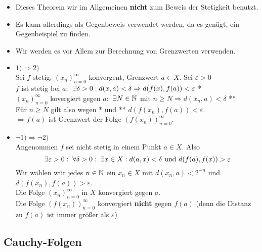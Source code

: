 \documentclass[main.tex]{subfiles}
\begin{document}
\begin{Bemerkung}
  \begin{itemize}
    \item Dieses Theorem wir im Allgemeinen \textbf{nicht} zum Beweis der Stetigkeit benutzt.
    \item Es kann allerdings als Gegenbeweis verwendet werden, da es genügt, ein Gegenbeispiel zu finden.
    \item Wir werden es vor Allem zur Berechnung von Grenzwerten verwenden.
  \end{itemize}
\end{Bemerkung}

\begin{Beweis}
  \begin{itemize}
    \item $1) \Rightarrow 2)$\\
      Sei $f$ stetig, $(x_n)_{n=0}^\infty$ konvergent, Grenzwert $a \in X$. Sei $\varepsilon > 0$\\
      $f$ ist stetig bei $a$: $\;\exists \delta > 0 : d(x,a) <  \delta \Rightarrow d(f(x),f(a)) < \varepsilon$ * \\
      $(x_n)_{n=0}^\infty$ kovergiert gegen $a$: $\;\exists N \in \mathbb{N}$ mit $n \geq N \Rightarrow d(x_n,a) < \delta$ **\\
      Für $n \geq N$ gilt also wegen * und ** $d(f(x_n),f(a)) < \varepsilon$.\\
      $\Rightarrow f(a)$ ist Grenzwert der Folge $(f(x_n))_{n = 0}^\infty$.
    \item $\lnot 1) \Rightarrow \lnot 2)$\\
      Angenommen $f$ sei nicht stetig in einem Punkt $a \in X$. Also
      $$ \;\exists \varepsilon > 0 : \;\forall \delta >0: \;\exists x \in X : d(a,x) < \delta \text{ und } d(f(a),f(x)) > \varepsilon$$
      Wir wählen wür jedes $n \in \mathbb{N}$ ein $x_n \in X$ mit $d(x_n,a) < 2^{-n}$ und $d(f(x_n),f(a)) > \varepsilon$.\\
      Die Folge $(x_n)_{n=0}^\infty$ in $X$ konvergiert gegen $a$.\\
      Die Folge $(f(x_n))_{n = 0}^\infty$ konvergiert \textbf{nicht} gegen $f(a)$ (denn die Distanz zu $f(a)$ ist immer größer als $\varepsilon$)
  \end{itemize}
\end{Beweis}

\subsection{Cauchy-Folgen}
\end{document}
